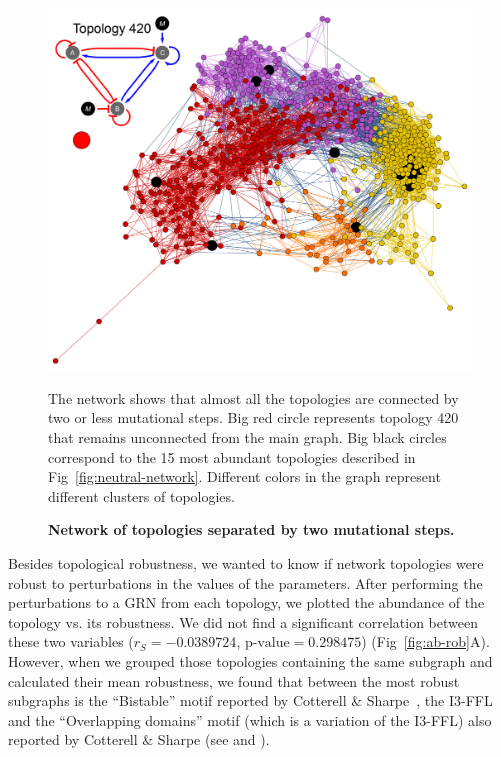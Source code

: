 \documentclass[10pt,letterpaper]{article}
\begin{document}
\begin{figure}
 \includegraphics[width=\textwidth]{figures/results/Fig5}
 \caption{\bf Network of topologies separated by two mutational steps.}
 The network shows that almost all the topologies are connected by two or less
 mutational steps. Big red circle represents topology 420 that remains
 unconnected from the main graph. Big black circles correspond to the 15
 most abundant topologies described in Fig~\ref{fig:neutral-network}.
 Different colors in the graph represent different clusters of topologies.
 \label{fig:2neut-net}
\end{figure}

Besides topological robustness, we wanted to know if network topologies were
robust to perturbations in the values of the parameters. After performing the
perturbations to a GRN from each topology, we plotted the abundance of the
topology vs. its robustness. We did not find a significant correlation between
these two variables ($r_S = −0.0389724$, $\text{p-value} = 0.298475$)
(Fig~\ref{fig:ab-rob}A). However, when we grouped those topologies containing
the same subgraph and calculated their mean robustness, we found that between
the most robust subgraphs is the ``Bistable'' motif reported by Cotterell \&
Sharpe~\cite{Cotterell2010}, the I3-FFL and the ``Overlapping domains'' motif
(which is a variation of the I3-FFL) also reported by Cotterell \& Sharpe
(see  and ).
\end{document}
